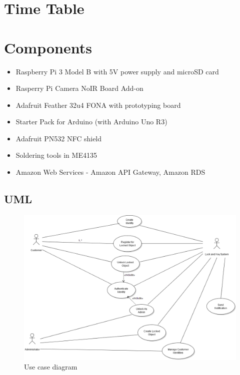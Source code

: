 \documentclass{article}
\begin{document}


\section{Time Table}



\section{Components}

\begin{itemize}
\item Raspberry Pi 3 Model B with 5V power supply and microSD card
\item Rasperry Pi Camera NoIR Board Add-on
\item Adafruit Feather 32u4 FONA with prototyping board
\item Starter Pack for Arduino (with Arduino Uno R3)
\item Adafruit PN532 NFC shield
\item Soldering tools in ME4135
\item Amazon Web Services - Amazon API Gateway, Amazon RDS
\end{itemize}

\pagebreak

\begin{appendices}

\section{UML}

\begin{figure}[!ht]

\includegraphics[width=\textwidth]{UML/lock_and_key}
\caption{Use case diagram}
\label{fig:use_case}

\end{figure}

\end{appendices}

\pagebreak

\printbibliography
\end{document}
